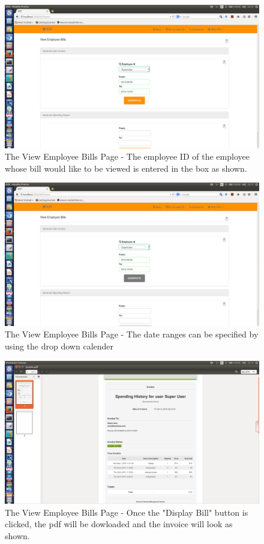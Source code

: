 \documentclass[a4paper,12pt]{report}
\begin{document}
\begin{figure}[H]
  \centering
    \includegraphics[width=1.0\textwidth]{screenshots/bill1.png}
    \caption{The View Employee Bills Page - The employee ID of the employee whose bill would like to be viewed is entered in the box as shown.}
\end{figure}

\begin{figure}[H]
  \centering
    \includegraphics[width=1.0\textwidth]{screenshots/bill2.png}
    \caption{The View Employee Bills Page - The date ranges can be specified by using the drop down calender}
\end{figure}

\begin{figure}[H]
  \centering
    \includegraphics[width=1.0\textwidth]{screenshots/bill3.png}
    \caption{The View Employee Bills Page - Once the "Display Bill" button is clicked, the pdf will be dowloaded and the invoice will look as shown.}
\end{figure}
\end{document}
